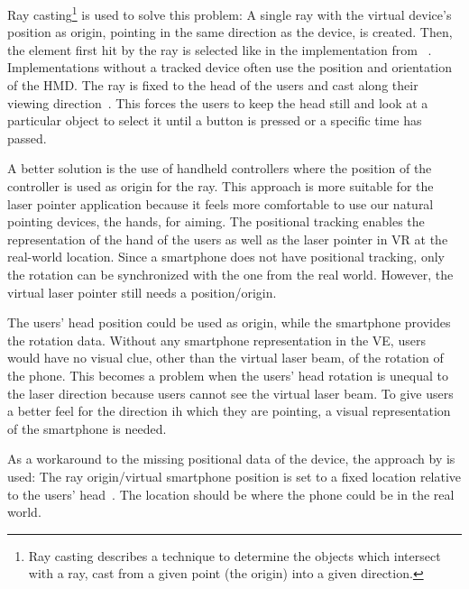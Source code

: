 Ray casting\footnote{Ray casting describes a technique to determine the objects which intersect with a ray, cast from a given point (the origin) into a given direction.} is used to solve this problem: A single ray with the virtual device's position as origin, pointing in the same direction as the device, is created. Then, the element first hit by the ray is selected like in the implementation from \citeauthor{Steed.2013}~\cite[46]{Steed.2013}. Implementations without a tracked device often use the position and orientation of the \gls{HMD}. The ray is fixed to the head of the users and cast along their viewing direction~\cite[23]{Kamm.2018}. This forces the users to keep the head still and look at a particular object to select it until a button is pressed or a specific time has passed.

A better solution is the use of handheld controllers where the position of the controller is used as origin for the ray. This approach is more suitable for the laser pointer application because it feels more comfortable to use our natural pointing devices, the hands, for aiming. The positional tracking enables the representation of the hand of the users as well as the laser pointer in \gls{VR} at the real-world location. Since a smartphone does not have positional tracking, only the rotation can be synchronized with the one from the real world. However, the virtual laser pointer still needs a position/origin.

The users' head position could be used as origin, while the smartphone provides the rotation data. Without any smartphone representation in the \gls{VE}, users would have no visual clue, other than the virtual laser beam, of the rotation of the phone. This becomes a problem when the users' head rotation is unequal to the laser direction because users cannot see the virtual laser beam. To give users a better feel for the direction ih which they are pointing, a visual representation of the smartphone is needed.

As a workaround to the missing positional data of the device, the approach by \citeauthor{Pietroszek.2014} is used: The ray origin/virtual smartphone position is set to a fixed location relative to the users' head~\cite[Figure 3]{Pietroszek.2014}. The location should be where the phone could be in the real world.

